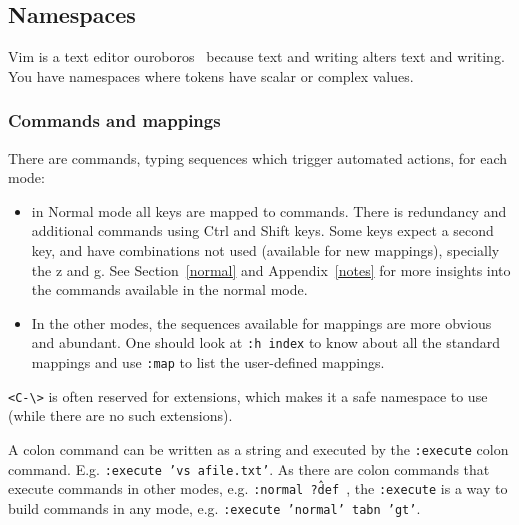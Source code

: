 \documentclass{article}
\newcommand{\ttt}[1] {
	\texttt{<#1>}}
\newcommand{\tttt}[1]{\texttt{#1}}
\begin{document}
\subsection{Namespaces}\label{namespaces}
Vim is a text editor ouroboros~\cite{ouroWiki} because
text and writing alters text and writing.
You have namespaces where tokens have scalar
or complex values.

\subsubsection{Commands and mappings}
There are commands, typing sequences which trigger automated actions,
for each mode:
\begin{itemize}
	\item in Normal mode all keys are mapped to commands.
		There is redundancy and additional commands
		using Ctrl and Shift keys.
		Some keys expect a second key,
    and have combinations not used (available for new mappings),
		specially the z and g.
    See Section~\ref{normal} and Appendix~\ref{notes}
    for more insights into the commands available in the
    normal mode.
	\item In the other modes, the sequences available for mappings are more obvious and abundant.
		One should look at \tttt{:h index} to know about all the standard mappings
		and use \tttt{:map} to list the user-defined mappings.
\end{itemize}

\ttt{C-\textbackslash} is often reserved for extensions,
which makes it a safe namespace to use (while there are no
such extensions).

A colon command can be written as a string
and executed by the \tttt{:execute} colon command.
E.g. \tttt{:execute 'vs afile.txt'}.
As there are colon commands that execute commands in other
modes, e.g. \tttt{:normal ?\^def },
the \tttt{:execute} is a way to build commands in any mode,
e.g.
\tttt{:execute 'normal' tabn 'gt'}.
\end{document}
